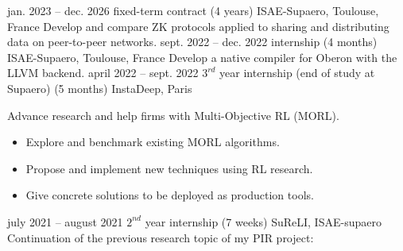 \documentclass[
    a4paper,
]{fortysecondscv}
\begin{document}
\makefrontsidebar
{}

\begin{cvtable}[4]
    \cvitem
        {jan. 2023 -- dec. 2026}
        {fixed-term contract \newline (4 years)}
        {ISAE-Supaero, Toulouse, France}
        {
            Develop and compare ZK protocols applied to sharing and distributing data on peer-to-peer networks.
        }
    \cvitem
        {sept. 2022 -- dec. 2022}
        {internship \newline (4 months)}
        {ISAE-Supaero, Toulouse, France}
        {
            Develop a native compiler for Oberon with the LLVM backend.
        }
    \cvitem
        {april 2022 -- sept. 2022}
        {$3^{rd}$ year internship (end of study at Supaero) \newline (5 months)}
        {InstaDeep, Paris}
        {
            Advance research and help firms with Multi-Objective RL (MORL).
            \begin{itemize}
                \item Explore and benchmark existing MORL algorithms.
                \item Propose and implement new techniques using RL research.
                \item Give concrete solutions to be deployed as production tools.
            \end{itemize}
        }
    \cvitem
        {july 2021 -- august 2021}
        {$2^{nd}$ year internship \newline (7 weeks)}
        {SuReLI, ISAE-supaero}
        {
            Continuation of the previous research topic of my PIR project:
}
\end{cvtable}
\end{document}
